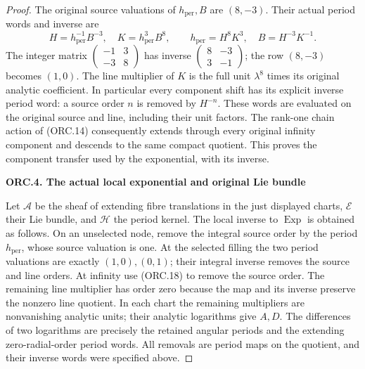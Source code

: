 \begin{proof}
The original source valuations of \(h_{\mathrm{per}},B\) are
\((8,-3)\). Their actual period words and inverse are
\[
H=h_{\mathrm{per}}^{-1}B^{-3},\quad
K=h_{\mathrm{per}}^3B^8,\qquad
h_{\mathrm{per}}=H^8K^3,\quad B=H^{-3}K^{-1}.
\tag{ORC.18}
\]
The integer matrix
\(\left(\begin{smallmatrix}-1&3\\-3&8\end{smallmatrix}\right)\)
has inverse
\(\left(\begin{smallmatrix}8&-3\\3&-1\end{smallmatrix}\right)\);
the row \((8,-3)\) becomes \((1,0)\).
The line multiplier of \(K\) is the full unit \(\lambda^8\)
times its original analytic coefficient. In particular every
component shift has its explicit inverse period word: a source
order \(n\) is removed by \(H^{-n}\). These words are evaluated
on the original source and line, including their unit factors.
The rank-one chain action of (ORC.14) consequently extends
through every original infinity component and descends to the
same compact quotient. This proves the component transfer used
by the exponential, with its inverse.

\par

\medskip\noindent\textbf{ORC.4. The actual local exponential and original Lie bundle}

\par\nobreak

Let \(\mathscr A\) be the sheaf of extending fibre translations
in the just displayed charts, \(\mathscr E\) their Lie bundle,
and \(\mathscr H\) the period kernel. The local inverse to
\(\operatorname{Exp}\) is obtained as follows. On an unselected
node, remove the integral source order by the period
\(h_{\mathrm{per}}\), whose source valuation is one. At the
selected filling the two period valuations are exactly
\((1,0),(0,1)\); their integral inverse removes the source
and line orders. At infinity use (ORC.18) to remove the source
order. The remaining line multiplier has order zero because
the map and its inverse preserve the nonzero line quotient.
In each chart the remaining multipliers are nonvanishing
analytic units; their analytic logarithms give \(A,D\).
The differences of two logarithms are precisely the retained
angular periods and the extending zero-radial-order period
words. All removals are period maps on the quotient, and
their inverse words were specified above.


\end{proof}
